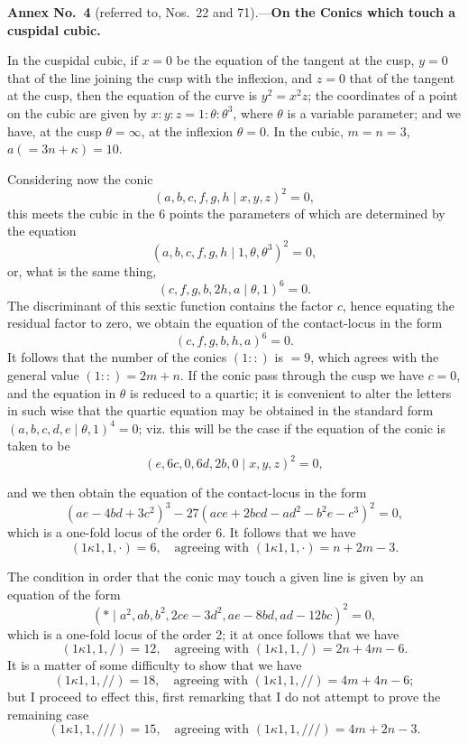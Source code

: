 \documentclass[12pt,a4paper]{article}
\begin{document}
\bigskip
\noindent\textbf{Annex No.~4} (referred to, Nos.~22 and 71).---\textbf{On the Conics which touch a cuspidal cubic.}

\smallskip

In the cuspidal cubic, if $x = 0$ be the equation of the tangent at the cusp, $y = 0$ that of the line joining the cusp with the inflexion, and $z = 0$ that of the tangent at the cusp, then the equation of the curve is $y^2 = x^2z$; the coordinates of a point on the cubic are given by $x : y : z = 1 : \theta : \theta^3$, where $\theta$ is a variable parameter; and we have, at the cusp $\theta = \infty$, at the inflexion $\theta = 0$. In the cubic, $m = n = 3$, $a (= 3n + \kappa) = 10$.

Considering now the conic
\[
(a, b, c, f, g, h \mid x, y, z)^2 = 0,
\]
this meets the cubic in the 6 points the parameters of which are determined by the equation
\[
(a, b, c, f, g, h \mid 1, \theta, \theta^3)^2 = 0,
\]
or, what is the same thing,
\[
(c, f, g, b, 2h, a \mid \theta, 1)^6 = 0.
\]
The discriminant of this sextic function contains the factor $c$, hence equating the residual factor to zero, we obtain the equation of the contact-locus in the form
\[
(c, f, g, b, h, a)^6 = 0.
\]
It follows that the number of the conics $(1 ::)$ is $= 9$, which agrees with the general value $(1 ::) = 2m + n$. If the conic pass through the cusp we have $c = 0$, and the equation in $\theta$ is reduced to a quartic; it is convenient to alter the letters in such wise that the quartic equation may be obtained in the standard form $(a, b, c, d, e \mid \theta, 1)^4 = 0$; viz. this will be the case if the equation of the conic is taken to be
\[
(e, 6c, 0, 6d, 2b, 0 \mid x, y, z)^2 = 0,
\]

and we then obtain the equation of the contact-locus in the form
\[
(ae - 4bd + 3c^2)^3 - 27(ace + 2bcd - ad^2 - b^2e - c^3)^2 = 0,
\]
which is a one-fold locus of the order 6. It follows that we have
\[
(1\kappa 1, 1, \cdot) = 6,\quad \text{agreeing with }(1\kappa 1, 1, \cdot) = n + 2m - 3.
\]

The condition in order that the conic may touch a given line is given by an equation of the form
\[
(\ast \mid a^2, ab, b^2, 2ce - 3d^2, ae - 8bd, ad - 12bc)^2 = 0,
\]
which is a one-fold locus of the order 2; it at once follows that we have
\[
(1\kappa 1, 1, /) = 12,\quad \text{agreeing with }(1\kappa 1, 1, /) = 2n + 4m - 6.
\]
It is a matter of some difficulty to show that we have
\[
(1\kappa 1, 1, //) = 18,\quad \text{agreeing with }(1\kappa 1, 1, //) = 4m + 4n - 6;
\]
but I proceed to effect this, first remarking that I do not attempt to prove the remaining case
\[
(1\kappa 1, 1, ///) = 15,\quad \text{agreeing with }(1\kappa 1, 1, ///) = 4m + 2n - 3.
\]
\end{document}

